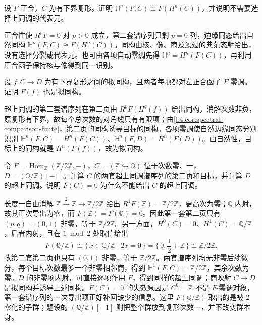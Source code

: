\begin{exercise}\label{b4:ex:15-exact-hyper}
	设 \(F\) 正合，\(C\) 为有下界复形。证明 \(\mathbb H^n(F,C)\cong F(H^n(C))\)，并说明不需要选择上同调的代表元。
\end{exercise}
\begin{solution}
	正合性使 \(R^pF=0\) 对 \(p>0\) 成立，第二套谱序列只剩 \(p=0\) 列，边缘同态给出自然同构 \(\mathbb H^n(F,C)\cong F(H^n(C))\)。同构由核、像、商及滤过的典范态射给出，没有选择分裂或代表元。也可由各项自动零调先得 \(\mathbb H^n=H^n(F(C))\)，再利用正合函子保持核与像得到同一识别。
\end{solution}

\begin{exercise}\label{b4:ex:15-acyclic-quasi}
	设 \(f:C\to D\) 为有下界复形之间的拟同构，且两者每项都对左正合函子 \(F\) 零调。证明 \(F(f)\) 也是拟同构。
\end{exercise}
\begin{solution}
	超上同调的第二套谱序列在第二页由 \(R^pF(H^q(f))\) 给出同构，消解次数非负，原复形有下界，故每个总次数的对角线只有有限项；由\cref{b4:cor:spectral-comparison-finite}，第二页的同构诱导目标的同构。各项零调使自然边缘同态分别识别 \(\mathbb H^n(F,C)=H^n(F(C))\)、\(\mathbb H^n(F,D)=H^n(F(D))\)。由自然性，目标上的同构就是 \(H^n(F(f))\)，故为拟同构。
\end{solution}

\begin{exercise}\label{b4:ex:15-naive-quasi-failure}
	令 \(F=\operatorname{Hom}_{\mathbb Z}(\mathbb Z/2\mathbb Z,-)\)，\(C=(\mathbb Z\hookrightarrow\mathbb Q)\) 位于次数零、一，\(D=(\mathbb Q/\mathbb Z)[-1]\)。计算 \(C\) 的两套超上同调谱序列的第二页和目标，并计算 \(D\) 的超上同调。说明 \(F(C)=0\) 为什么不能给出 \(C\) 的超上同调。
\end{exercise}
\begin{solution}
	长度一自由消解 \(\mathbb Z\xrightarrow2\mathbb Z\to\mathbb Z/2\mathbb Z\) 给出 \(R^1F(\mathbb Z)=\mathbb Z/2\mathbb Z\)，更高次为零；\(\mathbb Q\) 内射，故其正次导出为零，而 \(F(\mathbb Z)=F(\mathbb Q)=0\)。因此第一套第二页只有 \((p,q)=(0,1)\) 非零，等于 \(\mathbb Z/2\mathbb Z\)。另一方面，\(H^0(C)=0\)、\(H^1(C)=\mathbb Q/\mathbb Z\)，后者内射，且在 \(1\bmod 2\) 处取值给出
	\[
		F(\mathbb Q/\mathbb Z)\cong \{\,x\in\mathbb Q/\mathbb Z\mid 2x=0\,\} =\{\,0,\frac12+\mathbb Z\,\}\cong\mathbb Z/2\mathbb Z.
	\]
	故第二套第二页也只有 \((0,1)\) 非零，等于 \(\mathbb Z/2\mathbb Z\)。两套谱序列均无非零后续微分，每个目标次数最多一个非零相邻商，得到 \(\mathbb H^1(F,C)=\mathbb Z/2\mathbb Z\)，其余次数为零。\(D\) 的非零项内射，可直接逐项作用 \(F\)，得到同样的超上同调；商映射 \(C\to D\) 是拟同构并诱导上述同构。\(F(C)=0\) 的失效原因是 \(C^0=\mathbb Z\) 不是 \(F\)-零调对象，第一套谱序列的一次导出项正好补回缺少的信息。这里 \(F(\mathbb Q/\mathbb Z)\) 取出的是被 \(2\) 零化的子群；题设的 \((\mathbb Q/\mathbb Z)[-1]\) 则把整个群放到复形次数一，并不改变群本身。
\end{solution}

